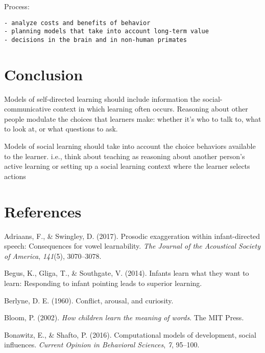 \documentclass[a4paper,man,apacite,floatsintext]{apa6}
\begin{document}
Process:

\begin{verbatim}
- analyze costs and benefits of behavior
- planning models that take into account long-term value
- decisions in the brain and in non-human primates 
\end{verbatim}

\section{Conclusion}\label{conclusion}

Models of self-directed learning should include information the
social-communicative context in which learning often occurs. Reasoning
about other people modulate the choices that learners make: whether it's
who to talk to, what to look at, or what questions to ask.

Models of social learning should take into account the choice behaviors
available to the learner. i.e., think about teaching as reasoning about
another person's active learning or setting up a social learning context
where the learner selects actions

\newpage

\section{References}\label{references}

\setlength{\parindent}{-0.4in} \setlength{\leftskip}{0.125in} \noindent

\hypertarget{refs}{}
\hypertarget{ref-adriaans2017prosodic}{}
Adriaans, F., \& Swingley, D. (2017). Prosodic exaggeration within
infant-directed speech: Consequences for vowel learnability. \emph{The
Journal of the Acoustical Society of America}, \emph{141}(5),
3070--3078.

\hypertarget{ref-begus2014infants}{}
Begus, K., Gliga, T., \& Southgate, V. (2014). Infants learn what they
want to learn: Responding to infant pointing leads to superior learning.

\hypertarget{ref-berlyne1960conflict}{}
Berlyne, D. E. (1960). Conflict, arousal, and curiosity.

\hypertarget{ref-bloom2002children}{}
Bloom, P. (2002). \emph{How children learn the meaning of words}. The
MIT Press.

\hypertarget{ref-bonawitz2016computational}{}
Bonawitz, E., \& Shafto, P. (2016). Computational models of development,
social influences. \emph{Current Opinion in Behavioral Sciences},
\emph{7}, 95--100.
\end{document}
